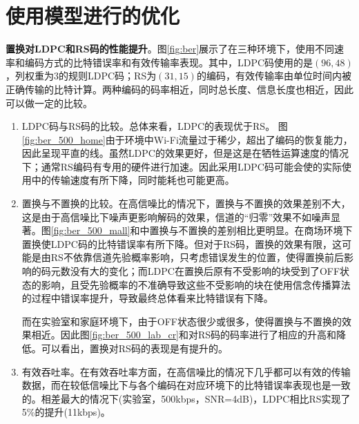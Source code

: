 \section{使用模型进行的优化}

\textbf{置换对LDPC和RS码的性能提升}。图\ref{fig:ber}展示了在三种环境下，使用不同速率和编码方式的比特错误率和有效传输率表现。其中，LDPC码使用的是$(96,48)$，列权重为$3$的规则LDPC码；RS为$(31,15)$的编码，有效传输率由单位时间内被正确传输的比特计算。两种编码的码率相近，同时总长度、信息长度也相近，因此可以做一定的比较。

\begin{enumerate}
	\item LDPC码与RS码的比较。总体来看，LDPC的表现优于RS。
	图\ref{fig:ber_500_home}由于环境中Wi-Fi流量过于稀少，超出了编码的恢复能力，因此呈现平直的线。虽然LDPC的效果更好，但是这是在牺牲运算速度的情况下；通常RS编码有专用的硬件进行加速。因此采用LDPC码可能会使的实际使用中的传输速度有所下降，同时能耗也可能更高。
	
	\item 置换与不置换的比较。在高信噪比的情况下，置换与不置换的效果差别不大，这是由于高信噪比下噪声更影响解码的效果，信道的“归零”效果不如噪声显著。图\ref{fig:ber_500_mall}和中置换与不置换的差别相比更明显。在商场环境下置换使LDPC码的比特错误率有所下降。但对于RS码，置换的效果有限，这可能是由RS不依靠信道先验概率影响，只考虑错误发生的位置，使得置换前后影响的码元数没有大的变化；而LDPC在置换后原有不受影响的块受到了OFF状态的影响，且受先验概率的不准确导致这些不受影响的块在使用信念传播算法的过程中错误率提升，导致最终总体看来比特错误有下降。
	
	而在实验室和家庭环境下，由于OFF状态很少或很多，使得置换与不置换的效果相近。因此图\ref{fig:ber_500_lab_cr}和对RS码的码率进行了相应的升高和降低。可以看出，置换对RS码的表现是有提升的。
	
	\item 有效吞吐率。在有效吞吐率方面，在高信噪比的情况下几乎都可以有效的传输数据，而在较低信噪比下与各个编码在对应环境下的比特错误率表现也是一致的。相差最大的情况下(实验室，500kbps，SNR=4dB)，LDPC相比RS实现了5\%的提升(11kbps)。
\end{enumerate}

